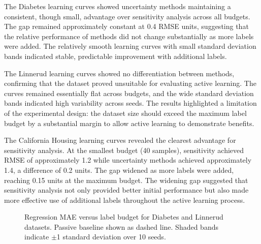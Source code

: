 \documentclass[conference]{IEEEtran}
\begin{document}
The Diabetes learning curves showed uncertainty methods maintaining a consistent, though small, advantage over sensitivity analysis across all budgets. The gap remained approximately constant at 0.4 RMSE units, suggesting that the relative performance of methods did not change substantially as more labels were added. The relatively smooth learning curves with small standard deviation bands indicated stable, predictable improvement with additional labels.

The Linnerud learning curves showed no differentiation between methods, confirming that the dataset proved unsuitable for evaluating active learning. The curves remained essentially flat across budgets, and the wide standard deviation bands indicated high variability across seeds. The results highlighted a limitation of the experimental design: the dataset size should exceed the maximum label budget by a substantial margin to allow active learning to demonstrate benefits.

The California Housing learning curves revealed the clearest advantage for sensitivity analysis. At the smallest budget (40 samples), sensitivity achieved RMSE of approximately 1.2 while uncertainty methods achieved approximately 1.4, a difference of 0.2 units. The gap widened as more labels were added, reaching 0.15 units at the maximum budget. The widening gap suggested that sensitivity analysis not only provided better initial performance but also made more effective use of additional labels throughout the active learning process.

\begin{figure}[t]
\centering
{}
\hfill
{}
\caption{Regression MAE versus label budget for Diabetes and Linnerud datasets. Passive baseline shown as dashed line. Shaded bands indicate $\pm$1 standard deviation over 10 seeds.}
\label{fig:reg-mae-compare}
\end{figure}
\end{document}

